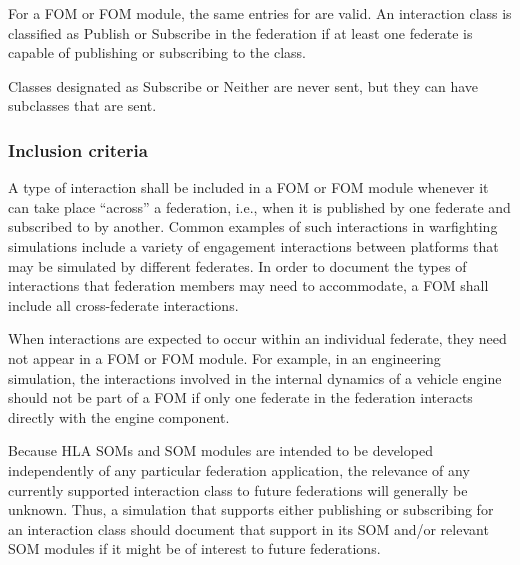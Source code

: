 For a FOM or FOM module, the same entries for  are valid. An interaction class is classified as Publish or Subscribe in the federation if at least one federate is capable of publishing or subscribing to the class.

Classes designated as Subscribe or Neither are never sent, but they can have subclasses that are sent.

\subsubsection{Inclusion criteria}
A type of interaction shall be included in a FOM or FOM module whenever it can take place ``across'' a federation, i.e., when it is published by one federate and subscribed to by another. Common examples of such interactions in warfighting simulations include a variety of engagement interactions between platforms that may be simulated by different federates. In order to document the types of interactions that federation members may need to accommodate, a FOM shall include all cross-federate interactions.

When interactions are expected to occur within an individual federate, they need not appear in a FOM or FOM module. For example, in an engineering simulation, the interactions involved in the internal dynamics of a vehicle engine should not be part of a FOM if only one federate in the federation interacts directly with the engine component.

Because HLA SOMs and SOM modules are intended to be developed independently of any particular federation application, the relevance of any currently supported interaction class to future federations will generally be unknown. Thus, a simulation that supports either publishing or subscribing for an interaction class should document that support in its SOM and/or relevant SOM modules if it might be of interest to future federations.


